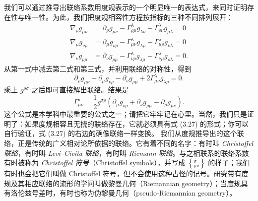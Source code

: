 我们可以通过推导出联络系数用度规表示的一个明显唯一的表达式，来同时证明存在性与唯一性。为此，我们把度规相容性方程按指标的三种不同排列展开：
\begin{align*}
\nabla_\rho g_{\mu\nu} &= \partial_\rho g_{\mu\nu} - \Gamma^\lambda_{\rho\mu}g_{\lambda\nu} - \Gamma^\lambda_{\rho\nu}g_{\mu\lambda} = 0\\
\nabla_\mu g_{\nu\rho} &= \partial_\mu g_{\nu\rho} - \Gamma^\lambda_{\mu\nu}g_{\lambda\rho} - \Gamma^\lambda_{\mu\rho}g_{\nu\lambda} = 0\\
\nabla_\nu g_{\rho\mu} &= \partial_\nu g_{\rho\mu} - \Gamma^\lambda_{\nu\rho}g_{\lambda\mu} - \Gamma^\lambda_{\nu\mu}g_{\rho\lambda} = 0.
\tag{3.25}
\end{align*}
从第一式中减去第二式和第三式，并利用联络的对称性，得到
\begin{equation*}
\partial_\rho g_{\mu\nu} - \partial_\mu g_{\nu\rho} - \partial_\nu g_{\rho\mu} + 2\Gamma^\lambda_{\mu\nu}g_{\lambda\rho} = 0.
\tag{3.26}
\end{equation*}
乘上 $g^{\rho\sigma}$ 之后即可直接解出联络。结果是
\begin{equation*}
\boxed{\;\Gamma^\sigma_{\mu\nu} = \frac{1}{2}g^{\sigma\rho}\left(\partial_\mu g_{\nu\rho} + \partial_\nu g_{\rho\mu} - \partial_\rho g_{\mu\nu}\right).\;}
\tag{3.27}
\end{equation*}
这个公式是本学科中最重要的公式之一；请把它牢牢记在心里。当然，我们只是证明了：如果度规相容且无挠的联络存在，它就必须具有式 (3.27) 的形式；你可以自行验证，式 (3.27) 的右边的确像联络一样变换。
我们从度规推导出的这个联络，正是传统的广义相对论所依据的联络。它有着不同的名字：有时叫 \emph{Christoffel 联络}，有时叫 \emph{Levi–Civita 联络}，有时叫 \emph{Riemann 联络}。与之相联系的联络系数有时被称为 \emph{Christoffel 符号}（Christoffel symbols），并写成 $\left\{^{\sigma}_{\mu\nu}\right\}$ 的样子；我们有时也会把它们叫做 Christoffel 符号，但不会使用这种古怪的记号。研究带有度规及其相应联络的流形的学问叫做黎曼几何（Riemannian geometry）；当度规具有洛伦兹号差时，有时也称为伪黎曼几何（pseudo-Riemannian geometry）。

